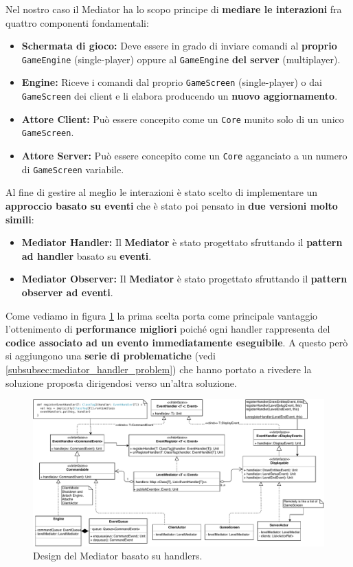 Nel nostro caso il Mediator ha lo scopo principe di \textbf{mediare le interazioni} fra quattro componenti fondamentali:
\begin{itemize}
	\item{\textbf{Schermata di gioco:}}
	Deve essere in grado di inviare comandi al \textbf{proprio}  \texttt{GameEngine} (single-player) oppure al \texttt{GameEngine} \textbf{del server} (multiplayer). 
	\item{\textbf{Engine:}}
	Riceve i comandi dal proprio \texttt{GameScreen} (single-player) o dai \texttt{GameScreen} dei client e li elabora producendo un \textbf{nuovo aggiornamento}. 
	\item{\textbf{Attore Client:}}
	Può essere concepito come un \texttt{Core} munito solo di un unico \texttt{GameScreen}.
	\item{\textbf{Attore Server:}}
	Può essere concepito come un \texttt{Core} agganciato a un numero di \texttt{GameScreen} variabile.
\end{itemize}
Al fine di gestire al meglio le interazioni è stato scelto di implementare un \textbf{approccio basato su eventi} che è stato poi pensato in \textbf{due versioni molto simili}:
\begin{itemize}
	\item{\textbf{Mediator Handler:}}
	Il \textbf{Mediator} è stato progettato sfruttando il \textbf{pattern ad handler} basato su \textbf{eventi}.
	\item{\textbf{Mediator Observer:}}
	Il \textbf{Mediator} è stato progettato sfruttando il \textbf{pattern observer ad eventi}.
\end{itemize}

Come vediamo in figura \ref{fig:mediatorHandler} la prima scelta porta come principale vantaggio l'ottenimento di \textbf{performance migliori} poiché ogni handler rappresenta del \textbf{codice associato ad un evento immediatamente eseguibile}. A questo però si aggiungono una \textbf{serie di problematiche} (vedi \ref{subsubsec:mediator_handler_problem}) che hanno portato a rivedere la soluzione proposta dirigendosi verso un'altra soluzione.
\begin{figure}[H]
	\centering
	\includegraphics[width=0.99\columnwidth]{drawio/mediator/mediatorHandler.pdf}
	\caption{Design del Mediator basato su handlers.}
	\label{fig:mediatorHandler}
\end{figure}

